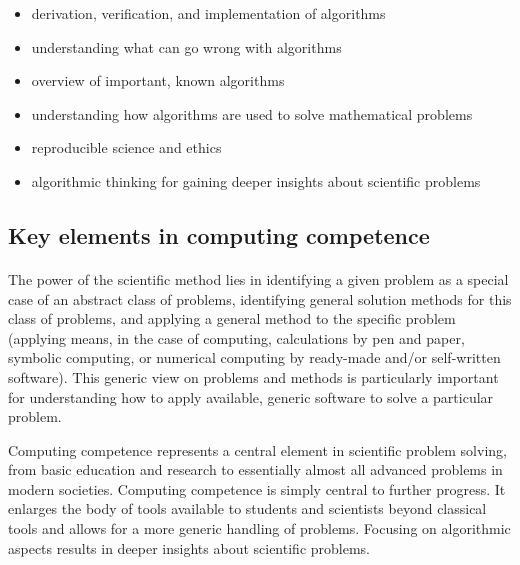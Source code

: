 \documentclass[%
oneside,                 %
final,                   %
10pt]{article}
\begin{document}
\begin{itemize}
\item derivation, verification, and implementation of algorithms

\item understanding what can go wrong with algorithms

\item overview of important, known algorithms

\item understanding how algorithms are used to solve mathematical problems

\item reproducible science and ethics

\item algorithmic thinking for gaining deeper insights about scientific problems
\end{itemize}

\noindent




\subsection{Key elements in computing competence}

\paragraph{}
The power of the scientific method lies in identifying a given problem
as a special case of an abstract class of problems, identifying
general solution methods for this class of problems, and applying a
general method to the specific problem (applying means, in the case of
computing, calculations by pen and paper, symbolic computing, or
numerical computing by ready-made and/or self-written software). This
generic view on problems and methods is particularly important for
understanding how to apply available, generic software to solve a
particular problem.


Computing competence represents a central element
in scientific problem solving, from basic education and research to
essentially almost all advanced problems in modern
societies. Computing competence is simply central to further
progress. It enlarges the body of tools available to students and
scientists beyond classical tools and allows for a more generic
handling of problems. Focusing on algorithmic aspects results in
deeper insights about scientific problems.
\end{document}
